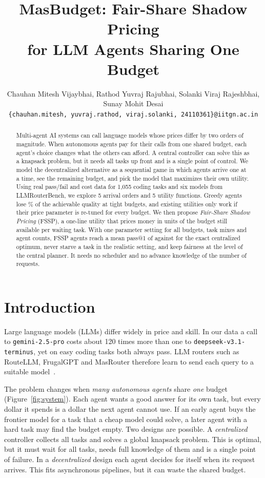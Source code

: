 \documentclass{article}
\title{MasBudget: Fair-Share Shadow Pricing\\ for LLM Agents Sharing One Budget}
\author{
  Chauhan Mitesh Vijaybhai, Rathod Yuvraj Rajubhai, Solanki Viraj Rajeshbhai, Sunay Mohit Desai \\
  \texttt{\{chauhan.mitesh, yuvraj.rathod, viraj.solanki, 24110361\}@iitgn.ac.in} \\
}
\begin{document}
\maketitle

\begin{abstract}
Multi-agent AI systems can call language models whose prices differ by two orders of magnitude. When autonomous agents pay for their calls from one shared budget, each agent's choice changes what the others can afford. A central controller can solve this as a knapsack problem, but it needs all tasks up front and is a single point of control. We model the decentralized alternative as a sequential game in which agents arrive one at a time, see the remaining budget, and pick the model that maximizes their own utility. Using real pass/fail and cost data for 1,055 coding tasks and six models from LLMRouterBench, we explore 5 arrival orders and 5 utility functions. Greedy agents lose \nnaiveGapTight\% of the achievable quality at tight budgets, and existing utilities only work if their price parameter is re-tuned for every budget. We then propose \emph{Fair-Share Shadow Pricing} (FSSP), a one-line utility that prices money in units of the budget still available per waiting task. With one parameter setting for all budgets, task mixes and agent counts, FSSP agents reach a mean pass@1 of \nfsspQ{} against \nmckpQ{} for the exact centralized optimum, never starve a task in the realistic setting, and keep fairness at the level of the central planner. It needs no scheduler and no advance knowledge of the number of requests.
\end{abstract}


\section{Introduction}

Large language models (LLMs) differ widely in price and skill. In our data a call to \texttt{gemini-2.5-pro} costs about 120 times more than one to \texttt{deepseek-v3.1-terminus}, yet on easy coding tasks both always pass. LLM routers such as RouteLLM, FrugalGPT and MasRouter therefore learn to send each query to a suitable model~\cite{ong2024routellm,chen2023frugalgpt,yue2025masrouter,zhang2026mtrouter}.

The problem changes when \emph{many autonomous agents} share \emph{one} budget (Figure~\ref{fig:system}). Each agent wants a good answer for its own task, but every dollar it spends is a dollar the next agent cannot use. If an early agent buys the frontier model for a task that a cheap model could solve, a later agent with a hard task may find the budget empty. Two designs are possible. A \emph{centralized} controller collects all tasks and solves a global knapsack problem. This is optimal, but it must wait for all tasks, needs full knowledge of them and is a single point of failure. In a \emph{decentralized} design each agent decides for itself when its request arrives. This fits asynchronous pipelines, but it can waste the shared budget.
\end{document}
